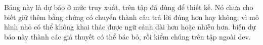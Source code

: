 \begin{table}[t]\centering
\caption{Đoạn chứa đáp án còn lại trong ngữ cảnh sau khi cắt ở $\budget=4000$ token, mô phỏng tất định trên xếp hạng đã lưu (180 câu dev có nhãn bằng chứng; không sinh, không chấm). Tập dev đã được dùng để thiết kế các biến thể, nên bảng này là dự báo dùng để đặt giả thuyết, không phải kết quả xác nhận.}
\label{tab:retrieval}
\small

\end{table}

Bảng này là dự báo ở mức truy xuất, trên tập đã dùng để thiết kế.
Nó chưa cho biết giữ thêm bằng chứng có chuyển thành câu trả lời đúng hơn hay không, vì mô hình nhỏ có thể không khai thác được ngữ cảnh dài hơn hoặc nhiễu hơn.
 biến dự báo này thành các giả thuyết có thể bác bỏ, rồi kiểm chúng trên tập ngoài dev.
